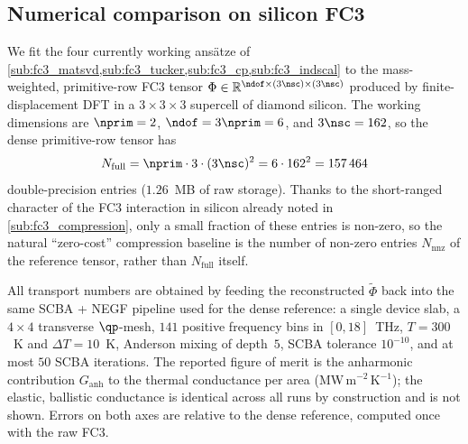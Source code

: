 \subsection{Numerical comparison on silicon FC3}
\label{sub:fc3_results}

We fit the four currently working ans\"atze of \cref{sub:fc3_matsvd,sub:fc3_tucker,sub:fc3_cp,sub:fc3_indscal}
to the mass-weighted, primitive-row FC3 tensor
$\Phi\in\mathbb{R}^{\ndof\times(3\nsc)\times(3\nsc)}$ produced by finite-displacement
DFT in a $3{\times}3{\times}3$ supercell of diamond silicon. The working dimensions are
$\nprim=2$, $\ndof=3\nprim=6$, and $3\nsc=162$, so the dense primitive-row tensor has
\begin{equation}\label{eq:fc3_full_entries}
  N_{\mathrm{full}}
  = \nprim\cdot 3\cdot (3\nsc)^{2}
  = 6\cdot 162^{2}
  = 157\,464
\end{equation}
double-precision entries ($1.26$~MB of raw storage). Thanks to the short-ranged character of the
FC3 interaction in silicon already noted in \cref{sub:fc3_compression}, only a small fraction of
these entries is non-zero, so the natural ``zero-cost'' compression baseline is the number of
non-zero entries $N_{\mathrm{nnz}}$ of the reference tensor, rather than $N_{\mathrm{full}}$
itself.

All transport numbers are obtained by feeding the reconstructed $\tilde\Phi$ back into the same
SCBA + NEGF pipeline used for the dense reference: a single device slab, a $4{\times}4$
transverse $\qp$-mesh, $141$ positive frequency bins in $[0,18]$~THz, $T=300$~K and
$\Delta T=10$~K, Anderson mixing of depth~$5$, SCBA tolerance $10^{-10}$, and at most $50$
SCBA iterations. The reported figure of merit is the anharmonic contribution
$G_{\mathrm{anh}}$ to the thermal conductance per area (MW\,m$^{-2}$\,K$^{-1}$); the
elastic, ballistic conductance is identical across all runs by construction and is not shown.
Errors on both axes are relative to the dense reference, computed once with the raw FC3.

